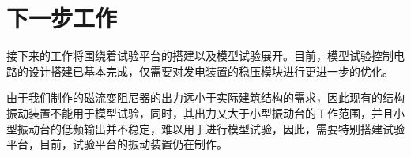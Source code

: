 \section{下一步工作}

接下来的工作将围绕着试验平台的搭建以及模型试验展开。目前，模型试验控制电路的设计搭建已基本完成，仅需要对发电装置的稳压模块进行更进一步的优化。

由于我们制作的磁流变阻尼器的出力远小于实际建筑结构的需求，因此现有的结构振动装置不能用于模型试验，同时，其出力又大于小型振动台的工作范围，并且小型振动台的低频输出并不稳定，难以用于进行模型试验，因此，需要特别搭建试验平台，目前，试验平台的振动装置仍在制作。
